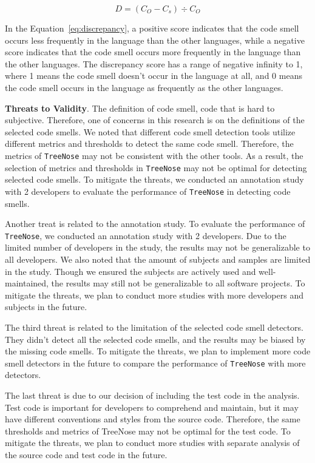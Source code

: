 \vspace{-1.0em}

\begin{equation}
    D = (C_{O} - C_{s}) \div C_{O}
    \label{eq:discrepancy}
\end{equation}

In the Equation~\ref{eq:discrepancy}, a positive score indicates that the code smell occurs less
frequently in the language than the other languages, while a negative score
indicates that the code smell occurs more frequently in the language than the
other languages. The discrepancy score has a range of negative infinity to 1,
where 1 means the code smell doesn't occur in the language at all, and 0 means
the code smell occurs in the language as frequently as the other languages.

{\bf Threats to Validity}. The definition of code smell, code that is hard to
subjective. Therefore, one of concerns in this research is on the definitions
of the selected code smells. We noted that different code smell detection tools
utilize different metrics and thresholds to detect the same code smell.
Therefore, the metrics of \texttt{TreeNose} may not be consistent with the
other tools. As a result, the selection of metrics and thresholds in
\texttt{TreeNose} may not be optimal for detecting selected code smells. To
mitigate the threats, we conducted an annotation study with 2 developers to
evaluate the performance of \texttt{TreeNose} in detecting code smells.

Another treat is related to the annotation study. To evaluate the performance
of \texttt{TreeNose}, we conducted an annotation study with 2 developers. Due
to the limited number of developers in the study, the results may not be
generalizable to all developers. We also noted that the amount of subjects and
samples are limited in the study. Though we ensured the subjects are actively
used and well-maintained, the results may still not be generalizable to all
software projects. To mitigate the threats, we plan to conduct more studies
with more developers and subjects in the future.

The third threat is related to the limitation of the selected code smell
detectors. They didn't detect all the selected code smells, and the results may
be biased by the missing code smells. To mitigate the threats, we plan to
implement more code smell detectors in the future to compare the performance of
\texttt{TreeNose} with more detectors.



The last threat is due to our decision of including the test code in the
analysis. Test code is important for developers to comprehend and maintain, but
it may have different conventions and styles from the source code. Therefore,
the same thresholds and metrics of TreeNose may not be optimal for the test
code. To mitigate the threats, we plan to conduct more studies with separate
analysis of the source code and test code in the future.
